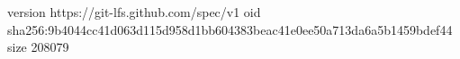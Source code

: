 version https://git-lfs.github.com/spec/v1
oid sha256:9b4044cc41d063d115d958d1bb604383beac41e0ee50a713da6a5b1459bdef44
size 208079
